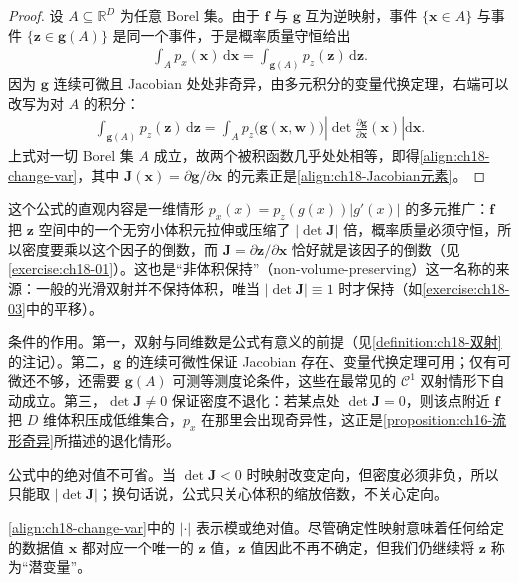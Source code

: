 \documentclass[../main.tex]{subfiles}
\begin{document}
\begin{proof}
设 $A\subseteq\mathbb{R}^{D}$ 为任意 Borel 集。由于 $\bm{f}$ 与 $\bm{g}$ 互为逆映射，事件 $\{\bm{x}\in A\}$ 与事件 $\{\bm{z}\in\bm{g}(A)\}$ 是同一个事件，于是概率质量守恒给出
\begin{align*}
  \int_{A}p_x(\bm{x})\,\mathrm{d}\bm{x}=\int_{\bm{g}(A)}p_z(\bm{z})\,\mathrm{d}\bm{z}.
\end{align*}
因为 $\bm{g}$ 连续可微且 Jacobian 处处非奇异，由多元积分的变量代换定理，右端可以改写为对 $A$ 的积分：
\begin{align*}
  \int_{\bm{g}(A)}p_z(\bm{z})\,\mathrm{d}\bm{z}=\int_{A}p_z\big(\bm{g}(\bm{x},\bm{w})\big)\left|\det\frac{\partial\bm{g}}{\partial\bm{x}}(\bm{x})\right|\mathrm{d}\bm{x}.
\end{align*}
上式对一切 Borel 集 $A$ 成立，故两个被积函数几乎处处相等，即得\eqref{align:ch18-change-var}，其中 $\bm{J}(\bm{x})=\partial\bm{g}/\partial\bm{x}$ 的元素正是\eqref{align:ch18-Jacobian元素}。
\end{proof}

\begin{remark}
这个公式的直观内容是一维情形 $p_x(x)=p_z(g(x))|g'(x)|$ 的多元推广：$\bm{f}$ 把 $\bm{z}$ 空间中的一个无穷小体积元拉伸或压缩了 $|\det\bm{J}|$ 倍，概率质量必须守恒，所以密度要乘以这个因子的倒数，而 $\bm{J}=\partial\bm{z}/\partial\bm{x}$ 恰好就是该因子的倒数（见\cref{exercise:ch18-01}）。这也是“非体积保持”（non-volume-preserving）这一名称的来源：一般的光滑双射并不保持体积，唯当 $|\det\bm{J}|\equiv1$ 时才保持（如\cref{exercise:ch18-03}中的平移）。

条件的作用。第一，双射与同维数是公式有意义的前提（见\cref{definition:ch18-双射}的注记）。第二，$\bm{g}$ 的连续可微性保证 Jacobian 存在、变量代换定理可用；仅有可微还不够，还需要 $\bm{g}(A)$ 可测等测度论条件，这些在最常见的 $\mathcal{C}^{1}$ 双射情形下自动成立。第三，$\det\bm{J}\neq0$ 保证密度不退化：若某点处 $\det\bm{J}=0$，则该点附近 $\bm{f}$ 把 $D$ 维体积压成低维集合，$p_x$ 在那里会出现奇异性，这正是\cref{proposition:ch16-流形奇异}所描述的退化情形。

公式中的绝对值不可省。当 $\det\bm{J}<0$ 时映射改变定向，但密度必须非负，所以只能取 $|\det\bm{J}|$；换句话说，公式只关心体积的缩放倍数，不关心定向。
\end{remark}

\eqref{align:ch18-change-var}中的 $|\cdot|$ 表示模或绝对值。尽管确定性映射意味着任何给定的数据值 $\bm{x}$ 都对应一个唯一的 $\bm{z}$ 值，$\bm{z}$ 值因此不再不确定，但我们仍继续将 $\bm{z}$ 称为“潜变量”。
\end{document}
